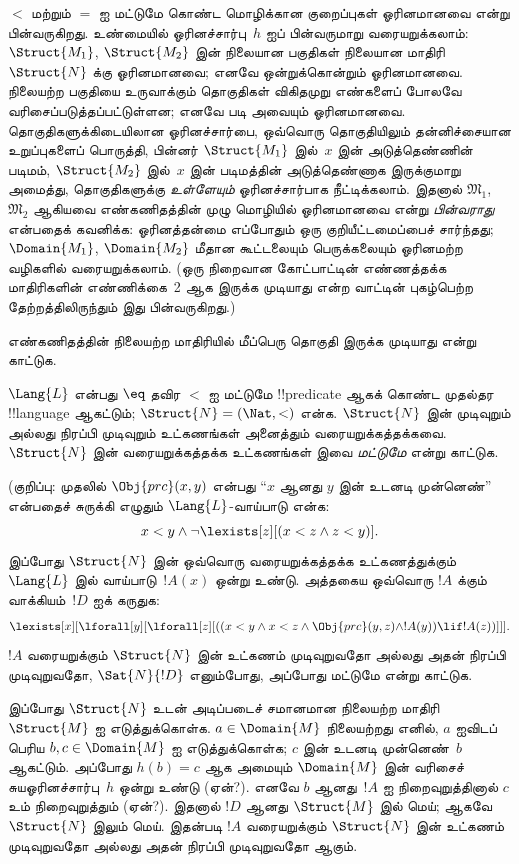\documentclass[../../../include/open-logic-section]{subfiles}
\begin{document}
$<$ மற்றும் $=$ ஐ மட்டுமே கொண்ட மொழிக்கான
குறைப்புகள் ஓரினமானவை என்று பின்வருகிறது.
உண்மையில் ஓரினச்சார்பு~$h$ ஐப்
பின்வருமாறு வரையறுக்கலாம்:
$\Struct{M_1}$, $\Struct{M_2}$
இன் நிலையான பகுதிகள் நிலையான மாதிரி
$\Struct{N}$ க்கு ஓரினமானவை;
எனவே ஒன்றுக்கொன்றும் ஓரினமானவை.
நிலையற்ற பகுதியை உருவாக்கும் தொகுதிகள்
விகிதமுறு எண்களைப் போலவே வரிசைப்படுத்தப்பட்டுள்ளன;
எனவே  படி
அவையும் ஓரினமானவை. தொகுதிகளுக்கிடையிலான
ஓரினச்சார்பை, ஒவ்வொரு தொகுதியிலும்
தன்னிச்சையான உறுப்புகளைப் பொருத்தி,
பின்னர் $\Struct{M_1}$ இல்~$x$
இன் அடுத்தெண்ணின் படிமம்,
$\Struct{M_2}$ இல்~$x$ இன் படிமத்தின்
அடுத்தெண்ணாக இருக்குமாறு அமைத்து,
தொகுதிகளுக்கு \emph{உள்ளேயும்}
ஓரினச்சார்பாக நீட்டிக்கலாம்.
இதனால் $\mathfrak{M}_1$,
$\mathfrak{M}_2$ ஆகியவை எண்கணிதத்தின்
முழு மொழியில் ஓரினமானவை என்று
\emph{பின்வராது} என்பதைக் கவனிக்க:
ஓரினத்தன்மை எப்போதும் ஒரு
குறியீட்டமைப்பைச் சார்ந்தது;
$\Domain{M_1}$, $\Domain{M_2}$
மீதான கூட்டலையும் பெருக்கலையும்
ஓரினமற்ற வழிகளில் வரையறுக்கலாம்.
(ஒரு நிறைவான கோட்பாட்டின்
எண்ணத்தக்க மாதிரிகளின் எண்ணிக்கை~2
ஆக இருக்க முடியாது என்ற வாட்டின்
புகழ்பெற்ற தேற்றத்திலிருந்தும்
இது பின்வருகிறது.)

\begin{prob}
எண்கணிதத்தின் நிலையற்ற மாதிரியில்
மீப்பெரு தொகுதி இருக்க முடியாது என்று காட்டுக.
\end{prob}

\begin{prob}
$\Lang{L}$ என்பது $\eq$ தவிர
$<$ ஐ மட்டுமே !!{predicate}
ஆகக் கொண்ட முதல்தர !!{language}
ஆகட்டும்; $\Struct{N} = (\Nat,
<)$ என்க. $\Struct{N}$ இன்
முடிவுறும் அல்லது நிரப்பி முடிவுறும்
உட்கணங்கள் அனைத்தும் வரையறுக்கத்தக்கவை.
$\Struct{N}$ இன் வரையறுக்கத்தக்க
உட்கணங்கள் இவை \emph{மட்டுமே}
என்று காட்டுக.

(குறிப்பு: முதலில்
$\Obj{prc}(x,y)$ என்பது
“$x$ ஆனது $y$ இன் உடனடி முன்னெண்”
என்பதைச் சுருக்கி எழுதும்
$\Lang{L}$-வாய்பாடு என்க:
\[
x<y \land \lnot \lexists[z][(x<z \land z < y)].
\]
இப்போது $\Struct{N}$ இன் ஒவ்வொரு
வரையறுக்கத்தக்க உட்கணத்துக்கும்
$\Lang{L}$ இல் வாய்பாடு~$!A(x)$
ஒன்று உண்டு. அத்தகைய ஒவ்வொரு
$!A$ க்கும் வாக்கியம்~$!D$ ஐக் கருதுக:
\[
\lexists[x][\lforall[y][\lforall[z][((x<y \land x<z \land \Obj{prc}(y,z)
  \land !A(y)) \lif !A(z))]]].
\]
$!A$ வரையறுக்கும் $\Struct{N}$
இன் உட்கணம் முடிவுறுவதோ அல்லது
அதன் நிரப்பி முடிவுறுவதோ,
$\Sat{N}{!D}$ எனும்போது,
அப்போது மட்டுமே என்று காட்டுக.

இப்போது $\Struct{N}$ உடன்
அடிப்படைச் சமானமான நிலையற்ற
மாதிரி~$\Struct{M}$ ஐ எடுத்துக்கொள்க.
$a \in \Domain{M}$ நிலையற்றது எனில்,
$a$ ஐவிடப் பெரிய
$b, c \in \Domain{M}$ ஐ எடுத்துக்கொள்க;
$c$ இன் உடனடி முன்னெண்~$b$
ஆகட்டும். அப்போது $h(b)=c$
ஆக அமையும் $\Domain{M}$ இன்
வரிசைச் சுயஓரினச்சார்பு~$h$
ஒன்று உண்டு (ஏன்?).
எனவே $b$ ஆனது~$!A$ ஐ
நிறைவுறுத்தினால் $c$ உம்
நிறைவுறுத்தும் (ஏன்?).
இதனால் $!D$ ஆனது
$\Struct{M}$ இல் மெய்;
ஆகவே $\Struct{N}$ இலும் மெய்.
இதன்படி $!A$ வரையறுக்கும்
$\Struct{N}$ இன் உட்கணம்
முடிவுறுவதோ அல்லது
அதன் நிரப்பி முடிவுறுவதோ
ஆகும்.
\end{prob}
\end{document}
